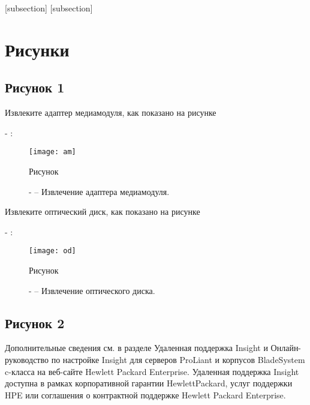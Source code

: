 \documentclass[a4paper,fontsize=14bp]{article}
\begin{document}
\fontsize{14}{14}\selectfont
 \renewcommand{\contentsname}{Содержание} %
 \renewcommand{\contentsname}{\centering Содержание}
 \tableofcontents  %
 \newpage
{} 
\pagestyle{fancy}
\fancyhf{}
\renewcommand{\headrulewidth}{0pt}
\renewcommand{\footrulewidth}{0pt}
\newpage
{}[subsection]
[subsection]
\renewcommand{\labelitemi}{\textendash} %

\newcommand{\rnum}{\addtocounter{rnum}{1}%
\textnormal{\thesubsection-\arabic{rnum}} }
\newcommand{\pnum}{\addtocounter{pnum}{1}%
\textnormal{\thesubsection-\arabic{pnum}} }
\fontsize{14}{14}\selectfont
\section{Рисунки}
\subsection{Рисунок 1} 
Извлеките адаптер медиамодуля, как показано на рисунке \pnum :
\begin{figure}[h]
\centering
\fontsize{14}{14}\selectfont
\texttt{[image: am]}

Рисунок \rnum -- Извлечение адаптера медиамодуля.
\end{figure}

Извлеките оптический диск, как показано на рисунке \pnum :
\begin{figure}[h]
\centering
\fontsize{14}{14}\selectfont
\texttt{[image: od]}

Рисунок \rnum -- Извлечение оптического диска.
\end{figure}
\subsection{Рисунок 2}
Дополнительные сведения см. в разделе Удаленная поддержка Insight и Онлайн-руководство по настройке Insight для серверов ProLiant и корпусов BladeSystem c-класса на веб-сайте Hewlett Packard Enterprise. Удаленная поддержка Insight доступна в рамках корпоративной гарантии HewlettPackard, услуг поддержки HPE или соглашения о контрактной поддержке Hewlett Packard Enterprise.
\end{document}
